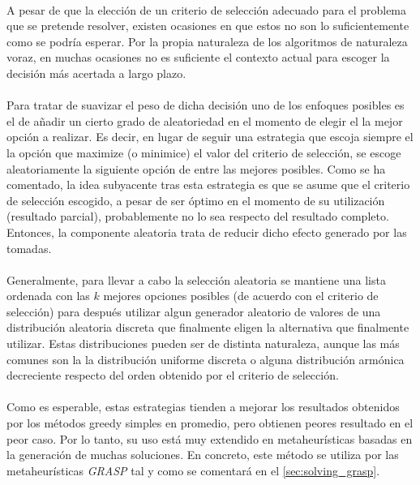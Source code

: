 \documentclass{subfiles}
\begin{document}
          \paragraph{}
          A pesar de que la elección de un criterio de selección adecuado para el problema que se pretende resolver, existen ocasiones en que estos no son lo suficientemente  como se podría esperar. Por la propia naturaleza de los algoritmos de naturaleza voraz, en muchas ocasiones no es suficiente el contexto actual para escoger la decisión más acertada a largo plazo.

          \paragraph{}
          Para tratar de suavizar el peso de dicha decisión uno de los enfoques posibles es el de añadir un cierto grado de aleatoriedad en el momento de elegir el la mejor opción a realizar. Es decir, en lugar de seguir una estrategia que escoja siempre el la opción que maximize (o minimice) el valor del criterio de selección, se escoge aleatoriamente la siguiente opción de entre las mejores posibles. Como se ha comentado, la idea subyacente tras esta estrategia es que se asume que el criterio de selección escogido, a pesar de ser óptimo en el momento de su utilización (resultado parcial), probablemente no lo sea respecto del resultado completo. Entonces, la componente aleatoria trata de reducir dicho efecto generado por las  tomadas.

          \paragraph{}
          Generalmente, para llevar a cabo la selección aleatoria se mantiene una lista ordenada con las $k$ mejores opciones posibles (de acuerdo con el criterio de selección) para después utilizar algun generador aleatorio de valores de una distribución aleatoria discreta que finalmente eligen la alternativa que finalmente utilizar. Estas distribuciones pueden ser de distinta naturaleza, aunque las más comunes son la la distribución uniforme discreta o alguna distribución armónica decreciente respecto del orden obtenido por el criterio de selección.

          \paragraph{}
          Como es esperable, estas estrategias tienden a mejorar los resultados obtenidos por los métodos greedy simples en promedio, pero obtienen peores resultado en el peor caso. Por lo tanto, su uso está muy extendido en metaheurísticas basadas en la generación de muchas soluciones. En concreto, este método se utiliza por las metaheurísticas \emph{GRASP} tal y como se comentará en el \cref{sec:solving_grasp}.
\end{document}
